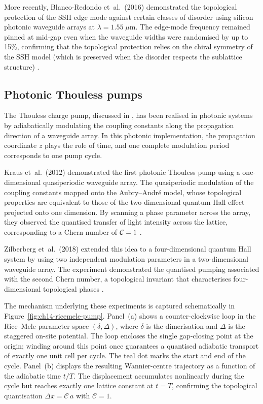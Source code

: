 More recently, Blanco-Redondo et~al.\ (2016) demonstrated the
topological protection of the SSH edge mode against certain classes of
disorder using silicon photonic waveguide arrays at
$\lambda=1.55\;\mu\mathrm{m}$.  The edge-mode frequency remained
pinned at mid-gap even when the waveguide widths were randomised by
up to 15\%, confirming that the topological protection relies on
the chiral symmetry of the SSH model (which is preserved when the
disorder respects the sublattice structure)
\cite{ozawa2018topological}.

\subsection{Photonic Thouless pumps}
\label{sec:ch14-photonic-pump}

The Thouless charge pump, discussed in ,
has been realised in photonic systems by adiabatically modulating the
coupling constants along the propagation direction of a waveguide
array.  In this photonic implementation, the propagation coordinate $z$
plays the role of time, and one complete modulation period
corresponds to one pump cycle.

Kraus et~al.\ (2012) demonstrated the first photonic Thouless pump
using a one-dimensional quasiperiodic waveguide array.  The
quasiperiodic modulation of the coupling constants mapped onto the
Aubry--Andr\'e model, whose topological properties are equivalent to
those of the two-dimensional quantum Hall effect projected onto one
dimension.  By scanning a phase parameter across the array, they
observed the quantised transfer of light intensity across the
lattice, corresponding to a Chern number of $\mathcal{C}=1$
\cite{ozawa2018topological,price2022roadmap}.

Zilberberg et~al.\ (2018) extended this idea to a four-dimensional
quantum Hall system by using two independent modulation parameters
in a two-dimensional waveguide array.  The experiment demonstrated
the quantised pumping associated with the second Chern number, a
topological invariant that characterises four-dimensional
topological phases \cite{price2022roadmap}.

The mechanism underlying these experiments is captured schematically in
Figure~\ref{fig:ch14-ricemele-pump}.  Panel~(a) shows a counter-clockwise loop
in the Rice--Mele parameter space $(\delta,\Delta)$, where $\delta$ is the
dimerisation and $\Delta$ is the staggered on-site potential.  The loop encloses
the single gap-closing point at the origin; winding around this point once
guarantees a quantised adiabatic transport of exactly one unit cell per cycle.
The teal dot marks the start and end of the cycle.  Panel~(b) displays the
resulting Wannier-centre trajectory as a function of the adiabatic time $t/T$.
The displacement accumulates nonlinearly during the cycle but reaches exactly
one lattice constant at $t=T$, confirming the topological quantisation
$\Delta x = \mathcal{C}\, a$ with $\mathcal{C}=1$.

